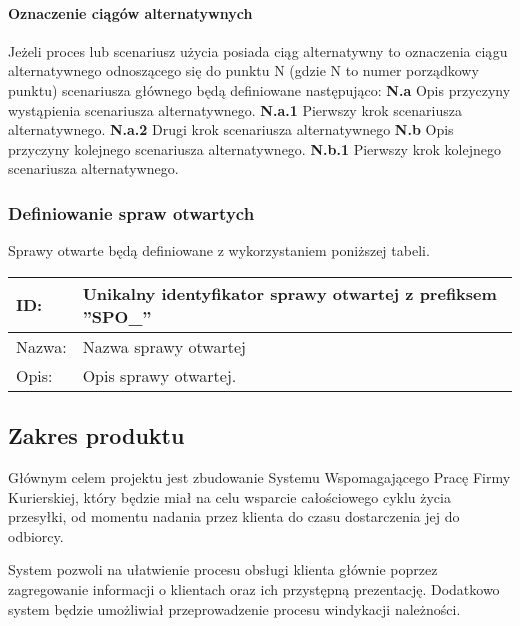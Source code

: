 \paragraph*{Oznaczenie ciągów alternatywnych}
Jeżeli proces lub scenariusz użycia posiada ciąg alternatywny to oznaczenia ciągu alternatywnego odnoszącego się do punktu N (gdzie N to numer porządkowy punktu) scenariusza głównego będą definiowane następująco: \newline
\textbf{N.a} Opis przyczyny wystąpienia scenariusza alternatywnego. \newline
\textbf{N.a.1} Pierwszy krok scenariusza alternatywnego. \newline
\textbf{N.a.2} Drugi krok scenariusza alternatywnego \newline
\textbf{N.b} Opis przyczyny kolejnego scenariusza alternatywnego. \newline
\textbf{N.b.1} Pierwszy krok kolejnego scenariusza alternatywnego.

\subsubsection*{Definiowanie spraw otwartych}
Sprawy otwarte będą definiowane z wykorzystaniem poniższej tabeli.

\begin{center}
\begin{tabular}[h]{|p{2cm}|p{13.1cm}|}
\hline
ID: & Unikalny identyfikator sprawy otwartej z prefiksem ''SPO\_'' \\ \hline
Nazwa: & Nazwa sprawy otwartej \\ \hline
Opis: & Opis sprawy otwartej. \\
\hline
\end{tabular}
\end{center}

\subsection{Zakres produktu}
Głównym celem projektu jest zbudowanie Systemu Wspomagającego Pracę Firmy Kurierskiej, który będzie miał na celu wsparcie całościowego cyklu życia przesyłki, od momentu nadania przez klienta do czasu dostarczenia jej do odbiorcy. 

System pozwoli na ułatwienie procesu obsługi klienta głównie poprzez zagregowanie informacji o klientach oraz ich przystępną prezentację. Dodatkowo system będzie umożliwiał przeprowadzenie procesu windykacji należności.

